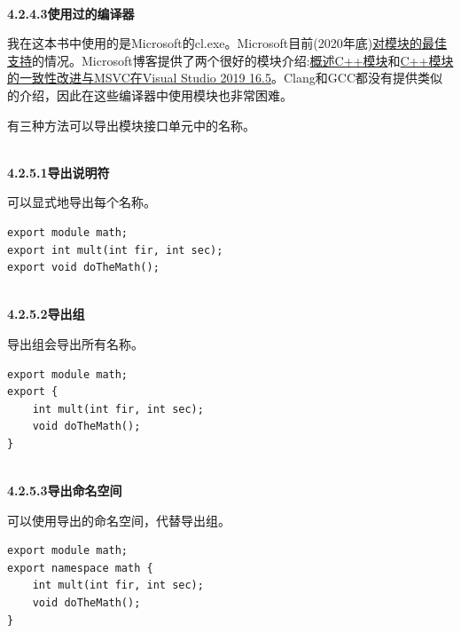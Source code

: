 \hspace*{\fill} \\ %
\noindent
\textbf{4.2.4.3\hspace{0.2cm}使用过的编译器}

我在这本书中使用的是Microsoft的cl.exe。Microsoft目前(2020年底)\href{https://en.cppreference.com/w/cpp/compiler_support}{对模块的最佳支持}的情况。Microsoft博客提供了两个很好的模块介绍:\href{https://docs.microsoft.com/en-us/cpp/cpp/modules-cpp?view=msvc-160&viewFallbackFrom=vs-2019}{概述C++模块}和\href{https://devblogs.microsoft.com/cppblog/c-modules-conformance-improvements-with-msvc-in-visual-studio-2019-16-5/}{C++模块的一致性改进与MSVC在Visual Studio 2019 16.5}。Clang和GCC都没有提供类似的介绍，因此在这些编译器中使用模块也非常困难。


有三种方法可以导出模块接口单元中的名称。

\hspace*{\fill} \\ %
\noindent
\textbf{4.2.5.1\hspace{0.2cm}导出说明符}

可以显式地导出每个名称。

\begin{lstlisting}[style=styleCXX]
export module math;
export int mult(int fir, int sec);
export void doTheMath();
\end{lstlisting}

\hspace*{\fill} \\ %
\noindent
\textbf{4.2.5.2\hspace{0.2cm}导出组}

导出组会导出所有名称。

\begin{lstlisting}[style=styleCXX]
export module math;
export {
	int mult(int fir, int sec);
	void doTheMath();
}
\end{lstlisting}

\hspace*{\fill} \\ %
\noindent
\textbf{4.2.5.3\hspace{0.2cm}导出命名空间}

可以使用导出的命名空间，代替导出组。

\begin{lstlisting}[style=styleCXX]
export module math;
export namespace math {
	int mult(int fir, int sec);
	void doTheMath();
}
\end{lstlisting}

